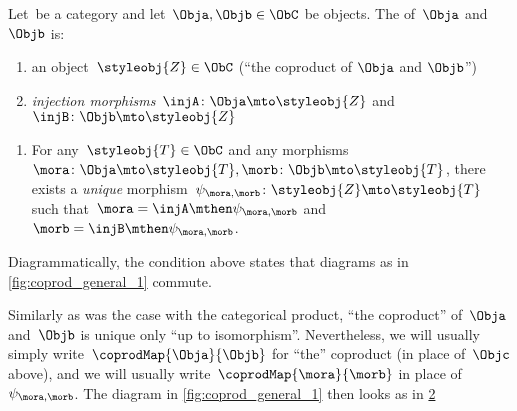 \begin{ctdefinition}
    \label{def:catcoproduct}
    Let~\CatC be a category and let~$\Obja, \Objb \in \ObC$ be objects.
    The \emph{} of~$\Obja$ and~$\Objb$ is:  \\
    \constit
    \begin{enumerate}
        \item an object~$\styleobj{Z} \in \ObC$ (``the coproduct of $\Obja$ and $\Objb$'')
        \item \emph{injection morphisms}~$\injA \colon \Obja \mto \styleobj{Z} $ and~$\injB \colon \Objb \mto \styleobj{Z} $
    \end{enumerate}
    \condit
    \begin{enumerate}
        \item For any~$\styleobj{T} \in \ObC$ and any morphisms~$\mora \colon  \Obja \mto \styleobj{T}, \morb \colon \Objb \mto \styleobj{T}$, there exists a \emph{unique} morphism~$\psi_{\mora, \morb} \colon \styleobj{Z} \mto \styleobj{T}$ such that~$\mora = \injA\mthen \psi_{\mora, \morb}$ and~$\morb = \injB \mthen \psi_{\mora,\morb}$.
    \end{enumerate}
\end{ctdefinition}

\begin{remark}
    Diagrammatically, the condition above states that diagrams as in \cref{fig:coprod_general_1} commute.
    \begin{figure}[h!]
        \centering
        \caption{}
        \label{fig:coprod_general_1}
        \label{fig:def-coproduct-diagram}
    \end{figure}
    Similarly as was the case with the categorical product, ``the coproduct'' of~$\Obja$ and~$\Objb$ is unique only ``up to isomorphism''.
    Nevertheless, we will usually simply write~$\coprodMap{\Obja}{\Objb}$ for ``the'' coproduct (in place of~$\Objc$ above), and we will usually write~$\coprodMap{\mora}{\morb}$ in place of~$\psi_{\mora, \morb}$.
    The diagram in \cref{fig:coprod_general_1} then looks as in \cref{fig:def-coproduct-diagram-generic}
\end{remark}

\begin{figure}
    \centering
    \caption{}
    \label{fig:def-coproduct-diagram-generic}
\end{figure}
%
%

